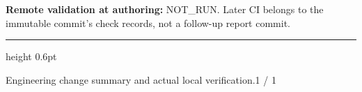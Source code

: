 \documentclass[10pt,a4paper]{article}
\begin{document}
\vspace{5pt}
{\footnotesize\color{muted}\textbf{Remote validation at authoring:} NOT\_RUN. Later CI belongs to the immutable commit's check records, not a follow-up report commit.}\par
\vfill
{\color{line}\hrule height 0.6pt}
\vspace{4pt}
{\sffamily\footnotesize\color{muted}Engineering change summary and actual local verification.\hfill 1 / 1}
\end{document}
